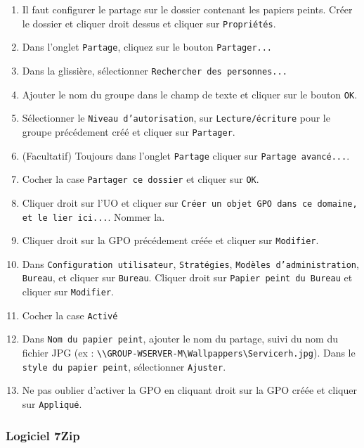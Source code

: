 				\begin{enumerate}
					\item Il faut configurer le partage sur le dossier contenant les papiers peints. Créer le dossier et cliquer droit dessus et cliquer sur \texttt{Propriétés}.
					\item Dans l'onglet \texttt{Partage}, cliquez sur le bouton \texttt{Partager...}
					\item Dans la glissière, sélectionner \texttt{Rechercher des personnes...}
					\item Ajouter le nom du groupe dans le champ de texte et cliquer sur le bouton \texttt{OK}.
					\item Sélectionner le \texttt{Niveau d'autorisation}, sur \texttt{Lecture/écriture} pour le groupe précédement créé et cliquer sur \texttt{Partager}.
					\item (Facultatif) Toujours dans l'onglet \texttt{Partage} cliquer sur \texttt{Partage avancé...}.
					\item Cocher la case \texttt{Partager ce dossier} et cliquer sur \texttt{OK}.
					\item Cliquer droit sur l'UO et cliquer sur \texttt{Créer un objet GPO dans ce domaine, et le lier ici...}. Nommer la.
					\item Cliquer droit sur la GPO précédement créée et cliquer sur \texttt{Modifier}.
					\item Dans \texttt{Configuration utilisateur}, \texttt{Stratégies}, \texttt{Modèles d'administration}, \texttt{Bureau}, et cliquer sur \texttt{Bureau}. Cliquer droit sur \texttt{Papier peint du Bureau} et cliquer sur \texttt{Modifier}.
					\item Cocher la case \texttt{Activé}
					\item Dans \texttt{Nom du papier peint}, ajouter le nom du partage, suivi du nom du fichier JPG (ex : \texttt{\textbackslash{}\textbackslash{}GROUP-WSERVER-M\textbackslash{}Wallpappers\textbackslash{}Servicerh.jpg}). Dans le \texttt{style du papier peint}, sélectionner \texttt{Ajuster}.
					\item Ne pas oublier d'activer la GPO en cliquant droit sur la GPO créée et cliquer sur \texttt{Appliqué}.
				\end{enumerate}
		\subsubsection{Logiciel 7Zip}
